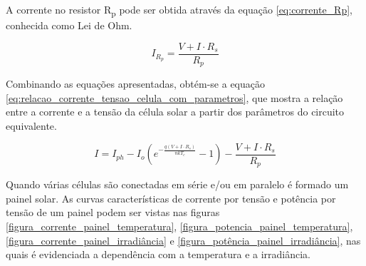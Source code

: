 A corrente no resistor R\textsubscript{p} pode ser obtida através da equação \ref{eq:corrente_Rp}, conhecida como Lei de Ohm.

\begin{equation} \label{eq:corrente_Rp}
I_{R_{p}} = \frac{V+I\cdot R_{s}}{R_{p}}
\end{equation}

Combinando as equações apresentadas, obtém-se a equação \ref{eq:relacao_corrente_tensao_celula_com_parametros}, que mostra a relação entre a corrente e a tensão da célula solar a partir dos parâmetros do circuito equivalente.

\begin{equation} \label{eq:relacao_corrente_tensao_celula_com_parametros}
I = I_{ph} - I_{o}(e^{-\frac{q(V+I\cdot R_{s})}{nkT_{c}}}-1) - \frac{V+I\cdot R_{s}}{R_{p}}
\end{equation}

Quando várias células são conectadas em série e/ou em paralelo é formado um painel solar. As curvas características de corrente por tensão e potência por tensão de um painel podem ser vistas nas figuras \ref{figura_corrente_painel_temperatura}, \ref{figura_potencia_painel_temperatura}, \ref{figura_corrente_painel_irradiância} e \ref{figura_potência_painel_irradiância}, nas quais é evidenciada a dependência com a temperatura e a irradiância. 

\solarPanelCharacteristicsMinusTwentyFive
{}\solarPanelCharacteristicsZero
{}\solarPanelCharacteristicsTwentyFive
{}\solarPanelCharacteristicsFifty

